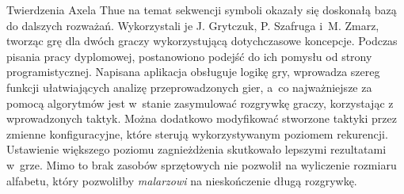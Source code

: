 \documentclass[document]{xmgr}
\begin{document}
\summary
Twierdzenia Axela Thue na temat sekwencji symboli okazały się doskonałą bazą do dalszych rozważań. Wykorzystali je J. Grytczuk, P. Szafruga i~M. Zmarz, tworząc grę dla dwóch graczy wykorzystującą dotychczasowe koncepcje. Podczas pisania pracy dyplomowej, postanowiono podejść do ich pomysłu od strony programistycznej. Napisana aplikacja obsługuje logikę gry, wprowadza szereg funkcji ułatwiających analizę przeprowadzonych gier, a~co najważniejsze za pomocą algorytmów jest w~stanie zasymulować rozgrywkę graczy, korzystając z wprowadzonych taktyk. Można dodatkowo modyfikować stworzone taktyki przez zmienne konfiguracyjne, które sterują wykorzystywanym poziomem rekurencji. Ustawienie większego poziomu zagnieżdżenia skutkowało lepszymi rezultatami w~grze. Mimo to brak zasobów sprzętowych nie pozwolił na wyliczenie rozmiaru alfabetu, który pozwoliłby \emph{malarzowi} na nieskończenie długą rozgrywkę.

\appendix






\listoftables

\listoffigures

\lstlistoflistings

\oswiadczenie
\end{document}
